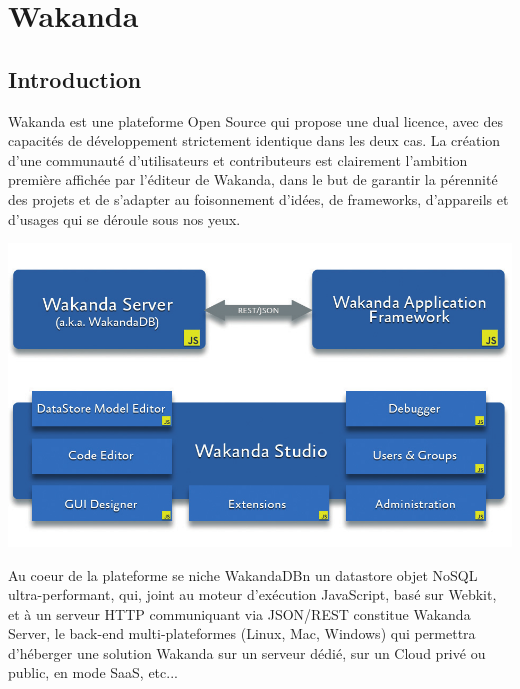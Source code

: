 \section{Wakanda}
\label{ch:wakanda}

\subsection{Introduction}

Wakanda est une plateforme Open Source qui propose une dual licence, avec des capacités de développement strictement identique dans les deux cas. La création d'une communauté d’utilisateurs et contributeurs est clairement l’ambition première affichée par l’éditeur de Wakanda, dans le but de garantir la pérennité des projets et de s’adapter au foisonnement d’idées, de frameworks, d’appareils et d’usages qui se déroule sous nos yeux.


 
\begin{center}
\includegraphics[scale=0.4]{img/wakanda.png}
\label{Plateforme Wakanda}
\end{center}




Au coeur de la plateforme se niche WakandaDBn un datastore objet NoSQL ultra-performant, qui, joint au moteur d’exécution JavaScript, basé sur Webkit, et à un serveur HTTP communiquant via JSON/REST constitue Wakanda Server, le back-end multi-plateformes (Linux, Mac, Windows) qui permettra d’héberger une solution Wakanda sur un serveur dédié, sur un Cloud privé ou public, en mode SaaS, etc...

